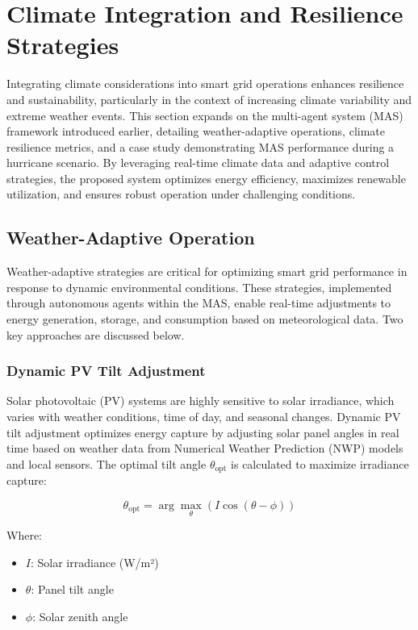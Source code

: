 \documentclass[12pt]{article}
\begin{document}
\section{Climate Integration and Resilience Strategies}

Integrating climate considerations into smart grid operations enhances resilience and sustainability, particularly in the context of increasing climate variability and extreme weather events. This section expands on the multi-agent system (MAS) framework introduced earlier, detailing weather-adaptive operations, climate resilience metrics, and a case study demonstrating MAS performance during a hurricane scenario. By leveraging real-time climate data and adaptive control strategies, the proposed system optimizes energy efficiency, maximizes renewable utilization, and ensures robust operation under challenging conditions.

\subsection{Weather-Adaptive Operation}

Weather-adaptive strategies are critical for optimizing smart grid performance in response to dynamic environmental conditions. These strategies, implemented through autonomous agents within the MAS, enable real-time adjustments to energy generation, storage, and consumption based on meteorological data. Two key approaches are discussed below.

\subsubsection{Dynamic PV Tilt Adjustment}

Solar photovoltaic (PV) systems are highly sensitive to solar irradiance, which varies with weather conditions, time of day, and seasonal changes. Dynamic PV tilt adjustment optimizes energy capture by adjusting solar panel angles in real time based on weather data from Numerical Weather Prediction (NWP) models and local sensors. The optimal tilt angle \( \theta_{\text{opt}} \) is calculated to maximize irradiance capture:

\[
\theta_{\text{opt}} = \arg\max_{\theta} \left( I \cos(\theta - \phi) \right)
\]

Where:
\begin{itemize}
    \item \( I \): Solar irradiance (W/m²)
    \item \( \theta \): Panel tilt angle
    \item \( \phi \): Solar zenith angle
\end{itemize}
\end{document}
